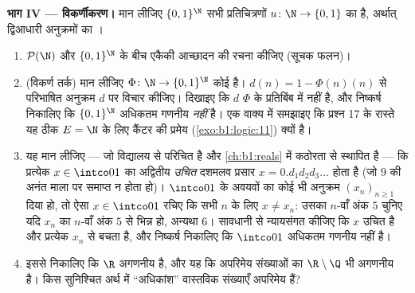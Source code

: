\begin{problem}
\medskip \noindent\textbf{भाग IV --- विकर्णीकरण।} मान लीजिए $\{0,1\}^{\N}$
सभी प्रतिचित्रणों $u \colon \N \to \{0, 1\}$ का  है, अर्थात्
द्विआधारी अनुक्रमों का ।
\begin{enumerate}[resume]
  \item $\mathcal{P}(\N)$ और $\{0,1\}^{\N}$ के बीच एकैकी आच्छादन की रचना
  कीजिए (सूचक फलन)।
  \item (विकर्ण तर्क) मान लीजिए $\Phi \colon \N \to \{0,1\}^{\N}$ कोई
   है। $d(n) = 1 - \Phi(n)(n)$ से परिभाषित अनुक्रम $d$ पर विचार
  कीजिए। दिखाइए कि $d$ $\Phi$ के प्रतिबिंब में नहीं है, और निष्कर्ष निकालिए
  कि $\{0,1\}^{\N}$ अधिकतम गणनीय \emph{नहीं} है। एक वाक्य में समझाइए कि
  प्रश्न 17 के रास्ते यह ठीक $E = \N$ के लिए कैंटर की प्रमेय
  (\cref{exo:b1:logic:11}) क्यों है।
  \item यह मान लीजिए --- जो विद्यालय से परिचित है और \cref{ch:b1:reals} में
  कठोरता से स्थापित है --- कि प्रत्येक $x \in \intco01$ का अद्वितीय
  \emph{उचित} दशमलव प्रसार $x = 0.d_1 d_2 d_3\dots$ होता है (जो $9$ की अनंत
  माला पर समाप्त न होता हो)। $\intco01$ के अवयवों का कोई भी अनुक्रम
  $(x_n)_{n \geq 1}$ दिया हो, तो ऐसा $x \in \intco01$ रचिए कि सभी $n$ के लिए
  $x \neq x_n$: उसका $n$-वाँ अंक $5$ चुनिए यदि $x_n$ का $n$-वाँ अंक $5$ से
  भिन्न हो, अन्यथा $6$। सावधानी से न्यायसंगत कीजिए कि $x$ उचित है और
  प्रत्येक $x_n$ से बचता है, और निष्कर्ष निकालिए कि $\intco01$ अधिकतम गणनीय
  नहीं है।
  \item इससे निकालिए कि $\R$ अगणनीय है, और यह कि अपरिमेय संख्याओं का 
  $\R \setminus \Q$ भी अगणनीय है। किस सुनिश्चित अर्थ में ``अधिकांश''
  वास्तविक संख्याएँ अपरिमेय हैं?
\end{enumerate}


\end{problem}
